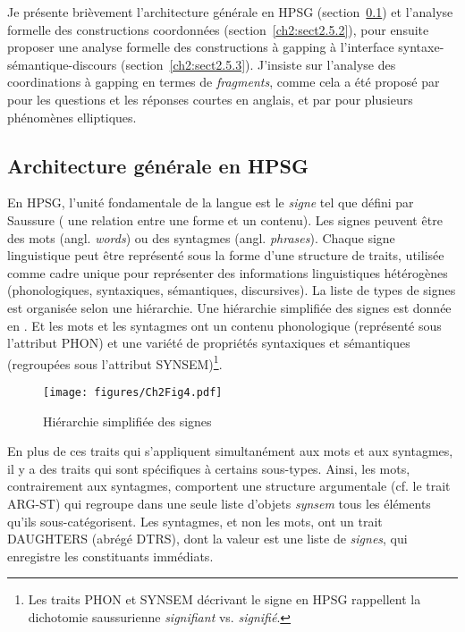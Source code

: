 Je présente brièvement l’architecture générale en HPSG (section~\ref{ch2:sect2.5.1}) et l’analyse formelle des constructions coordonnées (section~\ref{ch2:sect2.5.2}), pour ensuite proposer une analyse formelle des constructions à gapping à l’interface syntaxe-sémantique-discours (section~\ref{ch2:sect2.5.3}). J’insiste sur l’analyse des coordinations à gapping en termes de \textit{fragments}, comme cela a été proposé par \citet{GinzburgEtAl2000} pour les questions et les réponses courtes en anglais, et par \citet{CulicoverEtAl2005} pour plusieurs phénomènes elliptiques.  


\subsection{Architecture générale en HPSG} \label{ch2:sect2.5.1}

En HPSG, l’unité fondamentale de la langue est le \textit{signe} tel que défini par Saussure ({\cad} une relation entre une forme et un contenu). Les signes peuvent être des mots (angl. \textit{words}) ou des syntagmes (angl. \textit{phrases}). Chaque signe linguistique peut être représenté sous la forme d’une structure de traits, utilisée comme cadre unique pour représenter des informations linguistiques hétérogènes (phonologiques, syntaxiques, sémantiques, discursives). La liste de types de signes est organisée selon une hiérarchie. Une hiérarchie simplifiée des signes est donnée en . Et les mots et les syntagmes ont un contenu phonologique (représenté sous l’attribut PHON) et une variété de propriétés syntaxiques et sémantiques (regroupées sous l’attribut SYNSEM)\footnote{
 Les traits PHON et SYNSEM décrivant le signe en HPSG rappellent la dichotomie saussurienne \textit{signifiant} vs. \textit{signifié}.}. 

\begin{figure} 

   \texttt{[image: figures/Ch2Fig4.pdf]}

\caption{Hiérarchie simplifiée des signes}
\label{ch2:fig4}
\end{figure}

En plus de ces traits qui s’appliquent simultanément aux mots et aux syntagmes, il y a des traits qui sont spécifiques à certains sous-types. Ainsi, les mots, contrairement aux syntagmes, comportent une structure argumentale (cf. le trait ARG-ST) qui regroupe dans une seule liste d’objets \textit{synsem} tous les éléments qu’ils sous-catégorisent. Les syntagmes, et non les mots, ont un trait DAUGHTERS (abrégé DTRS), dont la valeur est une liste de \textit{signes}, qui enregistre les constituants immédiats. 

